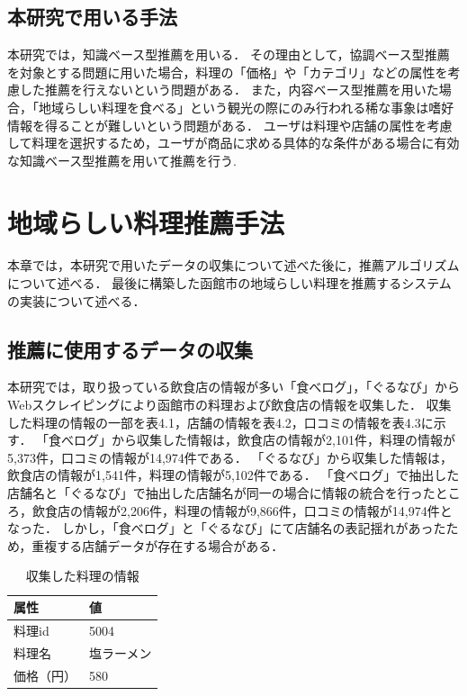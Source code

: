 \documentclass{funthesis}
\begin{document}
\section{本研究で用いる手法}
本研究では，知識ベース型推薦を用いる．
その理由として，協調ベース型推薦を対象とする問題に用いた場合，料理の「価格」や「カテゴリ」などの属性を考慮した推薦を行えないという問題がある．
また，内容ベース型推薦を用いた場合，「地域らしい料理を食べる」という観光の際にのみ行われる稀な事象は嗜好情報を得ることが難しいという問題がある．
ユーザは料理や店舗の属性を考慮して料理を選択するため，ユーザが商品に求める具体的な条件がある場合に有効な知識ベース型推薦を用いて推薦を行う.

\chapter{地域らしい料理推薦手法}
本章では，本研究で用いたデータの収集について述べた後に，推薦アルゴリズムについて述べる．
最後に構築した函館市の地域らしい料理を推薦するシステムの実装について述べる．


\section{推薦に使用するデータの収集}
本研究では，取り扱っている飲食店の情報が多い「食べログ」，「ぐるなび」からWebスクレイピングにより函館市の料理および飲食店の情報を収集した．
収集した料理の情報の一部を表4.1，店舗の情報を表4.2，口コミの情報を表4.3に示す．
「食べログ」から収集した情報は，飲食店の情報が2,101件，料理の情報が5,373件，口コミの情報が14,974件である．
「ぐるなび」から収集した情報は，飲食店の情報が1,541件，料理の情報が5,102件である．
「食べログ」で抽出した店舗名と「ぐるなび」で抽出した店舗名が同一の場合に情報の統合を行ったところ，飲食店の情報が2,206件，料理の情報が9,866件，口コミの情報が14,974件となった．
しかし，「食べログ」と「ぐるなび」にて店舗名の表記揺れがあったため，重複する店舗データが存在する場合がある．

\begin{table}[htb]
  \begin{center}
  \scriptsize
    \caption{収集した料理の情報}
    \normalsize
    \begin{tabular}{p{6cm}|p{6cm}}
    \hline
属性 & 値 \\ \hline\hline
      料理id & 5004 \\ \hline
      料理名 & 塩ラーメン \\ \hline
      価格（円） & 580 \\ \hline  \end{tabular}
  \end{center}
  \end{table}
  
\end{document}
